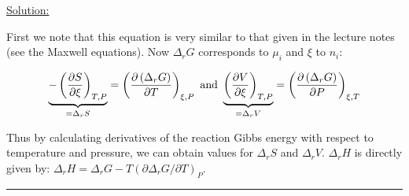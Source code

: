 \noindent
\underline{Solution:}

First we note that this equation is very similar to that given in the lecture notes (see the Maxwell equations). Now $\Delta_rG$ corresponds to $\mu_i$ and $\xi$ to $n_i$:

$$\mathop {\underbrace{-\left(\frac{\partial S}{\partial\xi}\right)_{T,P}}}\limits_{=\Delta_rS} = \left(\frac{\partial\left(\Delta_rG\right)}{\partial T}\right)_{\xi,P}\textnormal{ and } \mathop {\underbrace{\left(\frac{\partial V}{\partial \xi}\right)_{T,P}}}\limits_{=\Delta_rV} = \left(\frac{\partial\left(\Delta_rG\right)}{\partial P}\right)_{\xi,T}$$

Thus by calculating derivatives of the reaction Gibbs energy with respect to temperature and pressure, we can obtain values for $\Delta_rS$ and $\Delta_rV$. $\Delta_rH$ is directly given by: $\Delta_rH = \Delta_rG - T\left(\partial\Delta_rG / \partial T\right)_P$.

\hrule\vspace{0.5cm}
